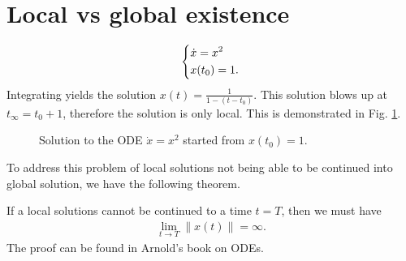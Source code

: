 \section{Local vs global existence}
\begin{ex}
	\begin{align}
		\begin{dcases}
			\dot{x} = x^2 \\
			x(t_0) = 1.
		\end{dcases}
	\end{align}
	Integrating yields the solution $x(t) = \frac{1}{1 - (t-t_0)}$. This solution blows up at $t_{\infty }=t_0 + 1$, therefore the solution is only local. This is demonstrated in Fig. \ref{fig:exploding_solution}.	
\begin{figure}[h!]
\centering	
{}
\caption{Solution to the ODE $\dot{x}=x^2$ started from $x(t_0)=1$.}
	\label{fig:exploding_solution}
\end{figure}
\end{ex}
To address this problem of local solutions not being able to be continued into global solution, we have the following theorem.
\begin{theorem}
	If a local solutions cannot be continued to a time $t=T$, then we must have
	\begin{align}
		\boxed{\lim_{t\to T}  \| {x}(t) \|= \infty.}
	\end{align}
The proof can be found in Arnold's book on ODEs.	
\end{theorem}


